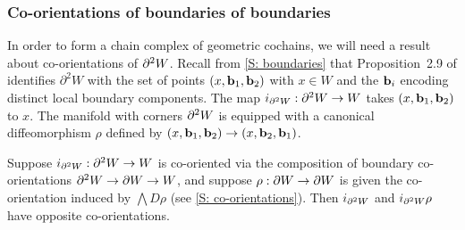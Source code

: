 
\begin{comment}
	\red{TO DO SOMEWHERE: It will be convenient to show that $g:W^0\to M$ with this co-orientation is the pullback of $M^0\into M$ (co-oriented as defined here) and $g:W\to M$ and similarly for $g:W^\pm\to M$.
		Also need to rewrite things in other places as $M^0$, $M^\pm$, etc instead of always writing $\varphi^{-1}((\infty,0])$ etc.
		Also need to show that $\bd W^0=-(\bd W)^0$, which should follow from the Leibniz rule and the first thing the previous sentence.}
\end{comment}

\subsubsection{Co-orientations of boundaries of boundaries}

In order to form a chain complex of geometric cochains, we will need a result about co-orientations of $\partial^2W$.
Recall from \cref{S: boundaries} that Proposition~2.9 of \cite{Joy12} identifies $\partial^2 W$ with the set of points $(x,\mathbf{b}_1,\mathbf{b}_2)$ with $x\in W$ and the $\mathbf{b}_i$ encoding distinct local boundary components.
The map $i_{\partial^2W}:\partial^2W\to W$ takes $(x,\mathbf{b}_1,\mathbf{b}_2)$ to $x$.
The manifold with corners $\partial^2W$ is equipped with a canonical diffeomorphism $\rho$ defined by $(x,\mathbf{b}_1,\mathbf{b}_2)\to (x,\mathbf{b}_2,\mathbf{b}_1)$.

\begin{lemma}\label{L: boundary2}
	Suppose $i_{\partial^2W}:\partial^2W\to W$ is co-oriented via the composition of boundary co-orientations $\partial^2W\to \partial W\to W$, and suppose $\rho:\partial W\to \partial W$ is given the co-orientation induced by $\bigwedge D\rho$ (see \cref{S: co-orientations}).
	Then $i_{\partial^2W}$ and $i_{\partial^2W}\rho$ have opposite co-orientations.
\end{lemma}

